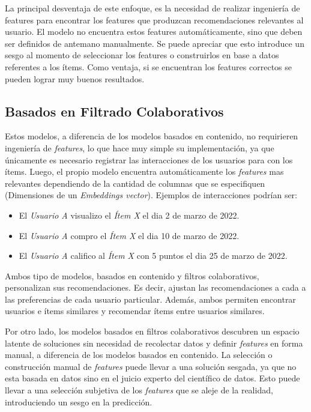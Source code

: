 \documentclass[11pt,a4paper,twoside]{thesis}
\begin{document}
La principal desventaja de este enfoque, es la necesidad de realizar ingeniería
de features para encontrar los features que produzcan recomendaciones
relevantes al usuario. El modelo no encuentra estos features automáticamente,
sino que deben ser definidos de antemano manualmente. Se puede apreciar que
esto introduce un sesgo al momento de seleccionar los features o construirlos
en base a datos referentes a los ítems. Como ventaja, si se encuentran los
features correctos se pueden lograr muy buenos resultados.

\subsection{Basados en Filtrado Colaborativos}

Estos modelos, a diferencia de los modelos basados en contenido, no requirieren
ingeniería de \textit{features}, lo que hace muy simple su implementación, ya
que únicamente es necesario registrar las interacciones de los usuarios para
con los ítems. Luego, el propio modelo encuentra automáticamente los
\textit{features} mas relevantes dependiendo de la cantidad de columnas que se
especifiquen (Dimensiones de un \textit{Embeddings vector}). Ejemplos de
interacciones podrían ser:

\begin{itemize}
	\item El \textit{Usuario A} visualizo el \textit{Ítem X} el dia 2 de marzo de 2022.
	\item El \textit{Usuario A} compro el \textit{Ítem X} el dia 10 de marzo de 2022.
	\item El \textit{Usuario A} califico al \textit{Ítem X} con 5 puntos el dia 25 de
	      marzo de 2022.
\end{itemize}

Ambos tipo de modelos, basados en contenido y filtros colaborativos,
personalizan sus recomendaciones. Es decir, ajustan las recomendaciones a cada
a las preferencias de cada usuario particular. Además, ambos permiten encontrar
usuarios e ítems similares y recomendar ítems entre usuarios similares.

Por otro lado, los modelos basados en filtros colaborativos descubren un
espacio latente de soluciones sin necesidad de recolectar datos y definir
\textit{features} en forma manual, a diferencia de los modelos basados en
contenido. La selección o construcción manual de \textit{features} puede llevar
a una solución sesgada, ya que no esta basada en datos sino en el juicio
experto del científico de datos. Esto puede llevar a una selección subjetiva de
los \textit{features} que se aleje de la realidad, introduciendo un sesgo en la
predicción.
\end{document}
